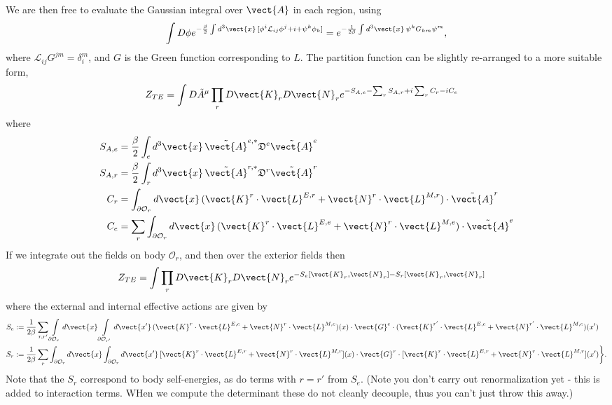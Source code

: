 We are then free to evaluate the Gaussian integral over $\vect{A}$ in each region, using
\begin{equation}
  \int D\phi e^{-\frac{\beta}{2}\int d^3\vect{x}\, [\phi^i \mathcal{L}_{ij}\phi^j +i+\psi^k\phi_k]}
= e^{-\frac{1}{2\beta}\int d^3\vect{x}\,\psi^k G_{km} \psi^m},
\end{equation}
where $\mathcal{L}_{ij}G^{jm} = \delta_{i}^m$, and $G$ is the Green function corresponding to $L$.
The partition function can be slightly re-arranged to a more suitable form,
\begin{align}
  Z_{TE} &= \int D\tilde{A}^\mu \prod_rD\vect{K}_rD\vect{N}_re^{-S_{A,e}-\sum_rS_{A,r}+i\sum_rC_r-iC_e}
\end{align}
where 
\begin{align}
  S_{A,e}&=\frac{\beta}{2}\int_e d^3\vect{x}\,  \tilde{\vect{A}}^{e,*} \mathfrak{D}^e\tilde{\vect{A}}^e \\
 S_{A,r}&=\frac{\beta}{2}\int_r d^3\vect{x}\, \tilde{\vect{A}}^{r,*} \mathfrak{D}^r\tilde{\vect{A}}^r\\
 C_r &=\int_{\partial\mathcal{O}_r}d\vect{x}\,
 (\vect{K}^r\cdot\vect{L}^{E,r} + \vect{N}^r\cdot\vect{L}^{M,r})\cdot\tilde{\vect{A}}^r\\
 C_e&=\sum_{r}\int_{\partial\mathcal{O}_r}d\vect{x}\,
 (\vect{K}^r\cdot\vect{L}^{E,e} + \vect{N}^r\cdot\vect{L}^{M,e})\cdot\tilde{\vect{A}}^e
\end{align}
If we integrate out the fields on body $\mathcal{O}_r$, and then over the exterior fields then
\begin{align}
  Z_{TE} &= \int \prod_rD\vect{K}_rD\vect{N}_re^{-S_e[\vect{K}_r,\vect{N}_r] - S_r[\vect{K}_r,\vect{N}_r] }
\end{align}
where the external and internal effective actions are given by 
\begin{align}
  S_e&:=\frac{1}{2\beta}\sum_{r,r'}
  \int\limits_{\partial\mathcal{O}_r}d\vect{x}\int\limits_{\partial\mathcal{O}_{r'}}d\vect{x'}\, 
  (\vect{K}^r\cdot\vect{L}^{E,e} + \vect{N}^r\cdot\vect{L}^{M,e})(x)\cdot\vect{G}^e\cdot
  (\vect{K}^{r'}\cdot\vect{L}^{E,e} + \vect{N}^{r'}\cdot\vect{L}^{M,e})(x')\\
  S_r&:= \frac{1}{2\beta}\sum_{r}\int_{\partial\mathcal{O}_r}d\vect{x}\int_{\partial\mathcal{O}_r}d\vect{x'}\,
    [\vect{K}^r\cdot\vect{L}^{E,r} + \vect{N}^r\cdot\vect{L}^{M,r}](x)\cdot
    \vect{G}^r\cdot[\vect{K}^r\cdot\vect{L}^{E,r} + \vect{N}^r\cdot\vect{L}^{M,r}](x')\bigg\}.
\end{align}
Note that the $S_r$ correspond to body self-energies, as do terms with $r=r'$ from $S_e$.
(Note you don't carry out renormalization yet - this is added to interaction terms.  WHen we compute
the determinant these do not cleanly decouple, thus you can't just throw this away.)

